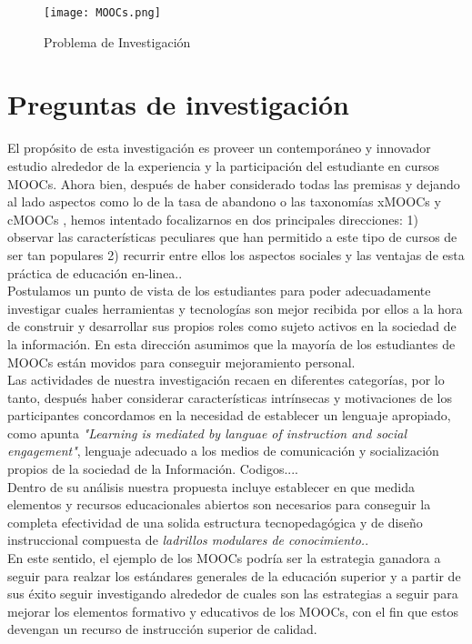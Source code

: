 \documentclass[11pt]{article}
\begin{document}
\vspace{10pt}

\begin{figure}[ht]\centering %
\texttt{[image: MOOCs.png]}
\caption{Problema de Investigación}
\label{fig:MOOCs.jpg}
\end{figure}

\section{Preguntas de investigación}

El propósito de esta investigación es proveer un contemporáneo y innovador estudio alrededor de la experiencia y la participación del estudiante en cursos MOOCs. Ahora bien, después de haber considerado todas las premisas y dejando al lado aspectos como lo de la tasa de abandono o las taxonomías xMOOCs y cMOOCs \citep{alt15}, hemos intentado focalizarnos en dos principales direcciones: 1) observar las características peculiares que han permitido a este tipo de cursos de ser tan populares 2) recurrir entre ellos los aspectos sociales y las ventajas de esta práctica de educación en-linea.\citep{jcAF17}.
\\ Postulamos un punto de vista de los estudiantes\citep{GuardiaOrtiz2013} para poder adecuadamente investigar cuales herramientas y tecnologías son mejor recibida por ellos a la hora de construir y desarrollar sus propios roles como sujeto activos en la sociedad de la información. En esta dirección asumimos que la mayoría de los estudiantes de MOOCs están movidos para conseguir mejoramiento  personal.\citep{Nrb17}
\\Las actividades de nuestra investigación recaen en diferentes categorías, por lo tanto, después haber considerar características intrínsecas y motivaciones de los participantes concordamos en la necesidad de establecer un lenguaje apropiado, como apunta \citep{cae16} \textit{"Learning is mediated by languae of instruction and social engagement"}, lenguaje adecuado a los medios de comunicación y socialización propios de la sociedad de la Información. Codigos....
\\ Dentro de su análisis nuestra propuesta incluye  establecer en que medida  elementos y recursos educacionales abiertos son necesarios para conseguir la completa efectividad de una solida estructura tecnopedagógica y de diseño instruccional compuesta de \textit{ladrillos modulares de conocimiento.}\citep{Dow05}.
\\ En este sentido, el ejemplo de los MOOCs podría ser la estrategia ganadora a seguir para realzar los estándares generales de la educación superior y a partir de sus éxito seguir investigando alrededor de cuales son las estrategias a seguir  para mejorar los  elementos formativo y educativos de los MOOCs, con el fin que estos devengan un recurso de instrucción superior de calidad.\cite{GuardiaOrtiz2013}
\end{document}
